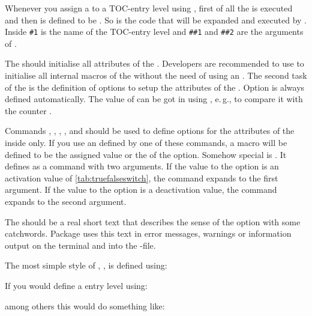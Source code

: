 Whenever you assign a  to a TOC-entry level using
, first of all the  is
executed and then  is defined to be
. So  is the code that will be
expanded and executed by . Inside
 \texttt{\#1} is the name of the TOC-entry level and
\texttt{\#\#1} and \texttt{\#\#2} are the arguments of
.

The  should initialise all attributes of the
. Developers are recommended to use  to
initialise all internal macros of the  without the need of
using an . The second task of the  is
the definition of options to setup the attributes of the . Option
 is always defined automatically. The value of 
can be got in  using
%
, e.\,g., to compare it with
the counter .

Commands ,
, ,
, and 
should be used to define options for the attributes of the
 inside  only. If you use an 
defined by one of these commands, a macro  will be defined to be the assigned value or the
 of the option. Somehow special is
. It defines  as a command with two arguments. If the value to
the option is an activation value of \autoref{tab:truefalseswitch},
 the command expands to the first
argument. If the value to the option is a deactivation value, the command
expands to the second argument.

The  should be a real short text that describes the sense
of the option with some catchwords. Package  uses this text
in error messages, warnings or information output on the terminal and into the
-file.

The most simple style of , , is defined
using:
\begin{lstcode}
\end{lstcode}
If you would define a entry level  using:
\begin{lstcode}
\end{lstcode}
among others this would do something like:
\begin{lstcode}
  \def\dummytocdepth{1}
  \def\l@dummy#1#2{}
\end{lstcode}

